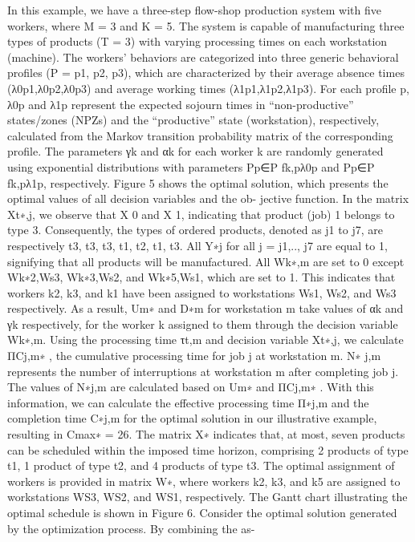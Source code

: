 In this example, we have a three-step flow-shop production system with five workers, where
M = 3 and K = 5. The system is capable of manufacturing three types of products (T = 3) with varying processing times on each workstation (machine). The workers’ behaviors are categorized into three generic behavioral profiles (P = p1, p2, p3), which are characterized by their average
absence times (λ0p1,λ0p2,λ0p3) and average working times (λ1p1,λ1p2,λ1p3). For each profile p, λ0p and λ1p represent the expected sojourn times in “non-productive” states/zones (NPZs) and the “productive” state (workstation), respectively, calculated from the Markov transition probability matrix of the corresponding profile. The parameters γk and αk for each worker k are randomly generated
using exponential distributions with parameters Pp∈P fk,pλ0p and Pp∈P fk,pλ1p, respectively. Figure 5 shows the optimal solution, which presents the optimal values of all decision variables and the ob-
jective function. In the matrix Xt∗,j, we observe that X 	0 and X 	1, indicating
that product (job) 1 belongs to type 3. Consequently, the types of ordered products, denoted as j1 to j7, are respectively t3, t3, t3, t1, t2, t1, t3. All Y∗j for all j = j1,.., j7 are equal to 1, signifying
that all products will be manufactured. All Wk∗,m are set to 0 except Wk∗2,Ws3, Wk∗3,Ws2, and Wk∗5,Ws1, which are set to 1. This indicates that workers k2, k3, and k1 have been assigned to workstations Ws1, Ws2, and Ws3 respectively. As a result, Um∗ and D∗m for workstation m take values of αk and γk respectively, for the worker k assigned to them through the decision variable Wk∗,m. Using the processing time τt,m and decision variable Xt∗,j, we calculate ΠCj,m∗ , the cumulative processing time for job j at workstation m. N∗ j,m represents the number of interruptions at workstation m after completing job j. The values of N∗j,m are calculated based on Um∗ and ΠCj,m∗ . With this information, we can calculate the effective processing time Π∗j,m and the completion time C∗j,m for the optimal solution in our illustrative example, resulting in Cmax∗ = 26.
The matrix X∗ indicates that, at most, seven products can be scheduled within the imposed time horizon, comprising 2 products of type t1, 1 product of type t2, and 4 products of type t3. The optimal assignment of workers is provided in matrix W∗, where workers k2, k3, and k5 are assigned to workstations WS3, WS2, and WS1, respectively. The Gantt chart illustrating the optimal schedule is shown in Figure 6.
Consider the optimal solution generated by the optimization process. By combining the as-
 

